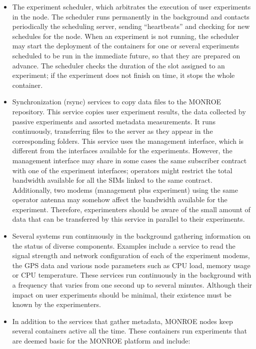 \documentclass[a4paper,10pt]{article}
\newcommand{\monroe}{MONROE}
\begin{document}
\begin{itemize}
	\item The experiment scheduler, which arbitrates the execution of user experiments in the node.
	The scheduler runs permanently in the background and contacts periodically the scheduling server, sending ``heartbeats'' and checking for new schedules for the node.
	When an experiment is not running, the scheduler may start the deployment of the containers for one or several experiments scheduled to be run in the immediate future, so that they are prepared on advance.
	The scheduler checks the duration of the slot assigned to an experiment; if the experiment does not finish on time, it stops the whole container.
	\item Synchronization (rsync) services to copy data files to the \monroe{} repository.
	This service copies user experiment results, the data collected by passive experiments and assorted metadata measurements.
	It runs continuously, transferring files to the server as they appear in the corresponding folders.
	This service uses the management interface, which is different from the interfaces available for the experiments.
	However, the management interface may share in some cases the same subscriber contract with one of the experiment interfaces; operators might restrict the total bandwidth available for all the SIMs linked to the same contract.
	Additionally, two modems (management plus experiment) using the same operator antenna may somehow affect the bandwidth available for the experiment.
	Therefore, experimenters should be aware of the small amount of data that can be transferred by this service in parallel to their experiments.
	\item Several systems run continuously in the background gathering information on the status of diverse components.
	Examples include a service to read the signal strength and network configuration of each of the experiment modems, the GPS data and various node parameters such as CPU load, memory usage or CPU temperature.
	These services run continuously in the background with a frequency that varies from one second up to several minutes.
	Although their impact on user experiments should be minimal, their existence must be known by the experimenters.
	\item In addition to the services that gather metadata, \monroe{} nodes keep several containers active all the time.
	These containers run experiments that are deemed basic for the \monroe{} platform and include:
	\begin{itemize}

\end{itemize}
\end{itemize}
\end{document}

